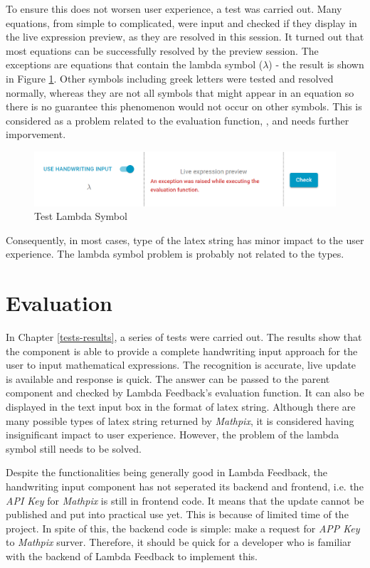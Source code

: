 \documentclass[12pt,twoside]{report}
\begin{document}
To ensure this does not worsen user experience, a test was carried out. Many
equations, from simple to complicated, were input and checked if they display in
the live expression preview, as they are resolved in this session. It turned out
that most equations can be successfully resolved by the preview session. The
exceptions are equations that contain the lambda symbol ($\lambda$) - the result
is shown in Figure \ref{fig:test-lambda}. Other symbols including greek letters
were tested and resolved normally, whereas they are not all symbols that might
appear in an equation so there is no guarantee this phenomenon would not occur
on other symbols. This is considered as a problem related to the evaluation function,
, and needs further imporvement.
\begin{figure}
    \centering
    \includegraphics[width=\linewidth, frame]{figures/test-lambda.png}
    \caption{Test Lambda Symbol}
    \label{fig:test-lambda}
\end{figure}

Consequently, in most cases, type of the latex string has minor impact to the user
experience. The lambda symbol problem is probably not related to the types.


\section{Evaluation}
In Chapter \ref{tests-results}, a series of tests were carried out. The results
show that the component is able to provide a complete handwriting input approach
for the user to input mathematical expressions. The recognition is accurate,
live update is available and response is quick. The answer can be passed to the
parent component and checked by Lambda Feedback's evaluation function. It can also
be displayed in the text input box in the format of latex string. Although there are many possible types of latex string returned by \textit{Mathpix}, it is considered having insignificant impact to user experience. However, the problem of the lambda symbol still needs to be solved.

Despite the functionalities being generally good in Lambda Feedback, the
handwriting input component has not seperated its backend and frontend, i.e. the
\textit{API Key} for \textit{Mathpix} is still in frontend code. It means that
the update cannot be published and put into practical use yet. This is because
of limited time of the project. In spite of this, the backend code is simple:
make a request for \textit{APP Key} to \textit{Mathpix} surver. Therefore, it
should be quick for a developer who is familiar with the backend of Lambda
Feedback to implement this.
\end{document}
